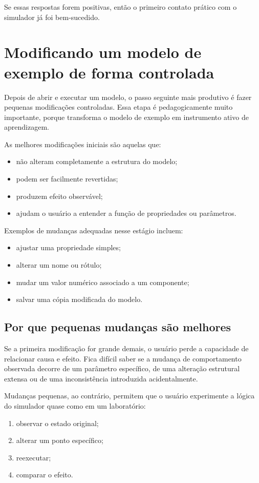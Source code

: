 Se essas respostas forem positivas, então o primeiro contato prático com o simulador já foi bem-sucedido.

\section{Modificando um modelo de exemplo de forma controlada}
\label{sec:cap4_modificando_modelo_controlado}

Depois de abrir e executar um modelo, o passo seguinte mais produtivo é fazer pequenas modificações controladas. Essa etapa é pedagogicamente muito importante, porque transforma o modelo de exemplo em instrumento ativo de aprendizagem.

As melhores modificações iniciais são aquelas que:
\begin{itemize}
    \item não alteram completamente a estrutura do modelo;
    \item podem ser facilmente revertidas;
    \item produzem efeito observável;
    \item ajudam o usuário a entender a função de propriedades ou parâmetros.
\end{itemize}

Exemplos de mudanças adequadas nesse estágio incluem:
\begin{itemize}
    \item ajustar uma propriedade simples;
    \item alterar um nome ou rótulo;
    \item mudar um valor numérico associado a um componente;
    \item salvar uma cópia modificada do modelo.
\end{itemize}

\subsection{Por que pequenas mudanças são melhores}
\label{subsec:cap4_por_que_pequenas_mudancas}

Se a primeira modificação for grande demais, o usuário perde a capacidade de relacionar causa e efeito. Fica difícil saber se a mudança de comportamento observada decorre de um parâmetro específico, de uma alteração estrutural extensa ou de uma inconsistência introduzida acidentalmente.

Mudanças pequenas, ao contrário, permitem que o usuário experimente a lógica do simulador quase como em um laboratório:
\begin{enumerate}
    \item observar o estado original;
    \item alterar um ponto específico;
    \item reexecutar;
    \item comparar o efeito.
\end{enumerate}

